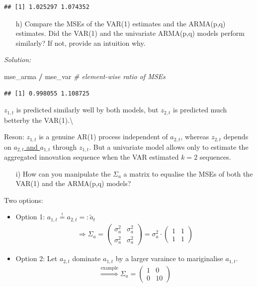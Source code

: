 \documentclass[12pt,a4paper]{article}
\newenvironment{Shaded}{\begin{snugshade}}{\end{snugshade}}
\newcommand{\CommentTok}[1]{\textcolor[rgb]{0.56,0.35,0.01}{\textit{#1}}}
\newcommand{\NormalTok}[1]{#1}
\newcommand{\OperatorTok}[1]{\textcolor[rgb]{0.81,0.36,0.00}{\textbf{#1}}}
\newcommand{\StringTok}[1]{\textcolor[rgb]{0.31,0.60,0.02}{#1}}
\begin{document}
\begin{verbatim}
## [1] 1.025297 1.074352
\end{verbatim}

\begin{itemize}
    \item[h)] Compare the MSEs of the VAR(1) estimates and the ARMA(p,q) estimates. Did the VAR(1) and the univariate ARMA(p,q) models perform similarly? If not, provide an intuition why. 
\end{itemize}

\emph{Solution:}

\begin{Shaded}
\begin{Highlighting}[]
\NormalTok{mse_arma }\OperatorTok{/}\StringTok{ }\NormalTok{mse_var }\CommentTok{# element-wise ratio of MSEs}
\end{Highlighting}
\end{Shaded}

\begin{verbatim}
## [1] 0.998055 1.108725
\end{verbatim}

\(z_{1,t}\) is predicted similarly well by both models, but \(z_{2,t}\)
is predicted much betterby the VAR(1).\textbackslash{}

Reson: \(z_{1,t}\) is a genuine AR(1) process independent of
\(a_{2,t}\), whereas \(z_{2,t}\) depends on
\underline{$a_{2,t}$ and $a_{1,t}$} through \(z_{1,t}\). But a
univariate model allows only to estimate the aggregated innovation
sequence when the VAR estimated \(k = 2\) sequences.

\begin{itemize}
    \item[i)] How can you manipulate the $\Sigma_a$ a matrix to equalise the MSEs of both the VAR(1) and the
ARMA(p,q) models?
\end{itemize}

Two options:

\begin{itemize}
  \item Option 1: $a_{1,t} \overset{!}{=} a_{2,t} =: \tilde{a}_t$
  \begin{align*}
      \Rightarrow \Sigma_a = \begin{pmatrix} \sigma_a^2 & \sigma_a^2 \\ \sigma_a^2 & \sigma_a^2 \end{pmatrix} = \sigma_a^2 \cdot \begin{pmatrix} 1 & 1 \\ 1 & 1 \end{pmatrix} 
  \end{align*}
  \item Option 2: Let $a_{2,t}$ dominate $a_{1,t}$ by a larger varaince to mariginalise $a_{1,t}$. 
  \begin{align*}
      \overset{\text{example}}{\Rightarrow} \Sigma_a = \begin{pmatrix} 1 & 0 \\ 0 & 10 \end{pmatrix}
  \end{align*}
\end{itemize}
\end{document}
